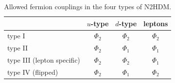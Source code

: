 \documentclass[12pt]{article}
\begin{document}
\begin{table}[ht]
  \begin{center}
    \begin{tabular}{l c c c}
    \hline
    &$u$-type& $d$-type& leptons\\
    \hline
    type I &$\Phi_2$&$\Phi_2$&$\Phi_2$\\
    type II &$\Phi_2$&$\Phi_1$&$\Phi_1$\\
    type III (lepton specific) &$\Phi_2$&$\Phi_2$&$\Phi_1$\\
    type IV (flipped) &$\Phi_2$&$\Phi_1$&$\Phi_2$\\
    \hline
    \end{tabular}
  \end{center}
\caption{Allowed fermion couplings in the four types of N2HDM.}
\label{tab:yukawa}
\end{table}
\end{document}
